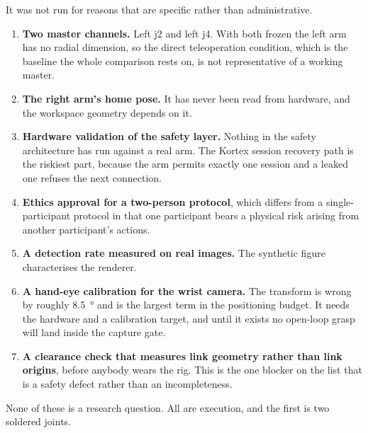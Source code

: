 It was not run for reasons that are specific rather than administrative.

\begin{enumerate}
  \item \textbf{Two master channels.} Left j2 and left j4. With both frozen
    the left arm has no radial dimension, so the direct teleoperation
    condition, which is the baseline the whole comparison rests on, is not
    representative of a working master.
  \item \textbf{The right arm's home pose.} It has never been read from
    hardware, and the workspace geometry depends on it.
  \item \textbf{Hardware validation of the safety layer.} Nothing in the
    safety architecture has run against a real arm. The Kortex session
    recovery path is the riskiest part, because the arm permits exactly one
    session and a leaked one refuses the next connection.
  \item \textbf{Ethics approval for a two-person protocol}, which differs from
    a single-participant protocol in that one participant bears a physical
    risk arising from another participant's actions.
  \item \textbf{A detection rate measured on real images.} The synthetic
    figure characterises the renderer.
  \item \textbf{A hand-eye calibration for the wrist camera.} The transform is
    wrong by roughly \SI{8.5}{\degree} and is the largest term in the
    positioning budget. It needs the hardware and a calibration target, and
    until it exists no open-loop grasp will land inside the capture gate.
  \item \textbf{A clearance check that measures link geometry rather than link
    origins}, before anybody wears the rig. This is the one blocker on the
    list that is a safety defect rather than an incompleteness.
\end{enumerate}

None of these is a research question. All are execution, and the first is two
soldered joints.
